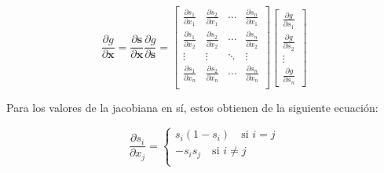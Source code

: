 \documentclass{article}
\begin{document}
\renewcommand{\arraystretch}{1.8}

\def\one{1}

\begin{equation*}
	\frac{\partial g}{\partial \bm{x}} = 
	\frac{\partial \bm{s}}{\partial \bm{x}} \frac{\partial g}{\partial \bm{s}} =
	\begin{bmatrix}
		\frac{\partial s_1}{\partial x_1} & \frac{\partial s_2}{\partial x_1} & \cdots & \frac{\partial s_n}{\partial x_1} \\
		\frac{\partial s_1}{\partial x_2} & \frac{\partial s_2}{\partial x_2} & \cdots & \frac{\partial s_n}{\partial x_2} \\
		\vdots & \vdots & \ddots & \vdots \\
		\frac{\partial s_1}{\partial x_n} & \frac{\partial s_2}{\partial x_n} & \cdots & \frac{\partial s_n}{\partial x_n} \\
		
	\end{bmatrix}
	\begin{bmatrix}
		\frac{\partial g}{\partial s_1} \\
		\frac{\partial g}{\partial s_2} \\
		\vdots \\
		\frac{\partial g}{\partial s_n}
	\end{bmatrix}
\end{equation*}

Para los valores de la jacobiana en sí, estos obtienen de la siguiente ecuación:

\begin{equation*}
	\frac{\partial s_i}{\partial x_j} = \begin{cases}
		s_i (1 - s_i) \quad \text{si } i = j \\
		- s_i s_j \quad \text{si } i \neq j \\
	\end{cases}
\end{equation*}
\end{document}
